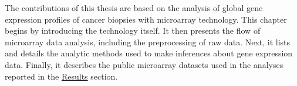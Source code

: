 The contributions of this thesis are based on the analysis of global gene
expression profiles of cancer biopsies with microarray technology.  This chapter
begins by introducing the technology itself.  It then presents the flow of
microarray data analysis, including the preprocessing of raw data.  Next, it
lists and details the analytic methods used to make inferences about gene
expression data. Finally, it describes the public microarray datasets used in
the analyses reported in the \hyperref[chap:results]{\textsf{Results}} section.




